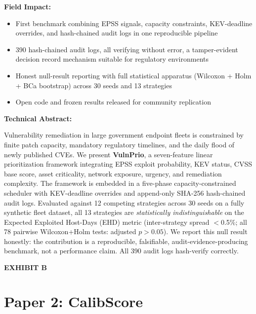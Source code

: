 \documentclass[12pt,letterpaper]{article}
\newenvironment{exhibitbox}{%
  \begin{mdframed}[backgroundcolor=lightblue,linecolor=headblue,linewidth=1.5pt,
                   topline=true,bottomline=true,leftline=true,rightline=true,
                   innertopmargin=12pt,innerbottommargin=12pt,
                   innerleftmargin=14pt,innerrightmargin=14pt]
}{%
  \end{mdframed}
}
\newcommand{\exhibitlabel}[1]{%
  \begin{center}
    \large\bfseries\textcolor{headblue}{#1}
  \end{center}
}
\begin{document}
\vspace{0.5em}
\noindent\textbf{Field Impact:}
\begin{itemize}[leftmargin=*,itemsep=2pt]
  \item First benchmark combining EPSS signals, capacity constraints,
        KEV-deadline overrides, and hash-chained audit logs in one reproducible pipeline
  \item 390 hash-chained audit logs, all verifying without error, 
        a tamper-evident decision record mechanism suitable for regulatory environments
  \item Honest null-result reporting with full statistical apparatus
        (Wilcoxon + Holm + BCa bootstrap) across 30 seeds and 13 strategies
  \item Open code and frozen results released for community replication
\end{itemize}

\vspace{0.5em}
\noindent\textbf{Technical Abstract:}

\begin{exhibitbox}
Vulnerability remediation in large government endpoint fleets is constrained by
finite patch capacity, mandatory regulatory timelines, and the daily flood of
newly published CVEs. We present \textbf{VulnPrio}, a seven-feature linear
prioritization framework integrating EPSS exploit probability, KEV status, CVSS
base score, asset criticality, network exposure, urgency, and remediation complexity.
The framework is embedded in a five-phase capacity-constrained scheduler with
KEV-deadline overrides and append-only SHA-256 hash-chained audit logs. Evaluated
against 12 competing strategies across 30 seeds on a fully synthetic fleet dataset,
all 13 strategies are \emph{statistically indistinguishable} on the Expected
Exploited Host-Days (EHD) metric (inter-strategy spread $<$0.5\%; all 78 pairwise
Wilcoxon+Holm tests: adjusted $p>0.05$). We report this null result honestly:
the contribution is a reproducible, falsifiable, audit-evidence-producing benchmark,
not a performance claim. All 390 audit logs hash-verify correctly.
\end{exhibitbox}

\newpage

\exhibitlabel{EXHIBIT B}
\section{Paper 2: CalibScore}
\end{document}
